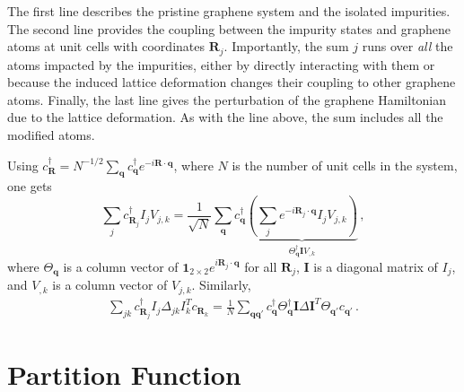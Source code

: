 \documentclass[aps, prb, superscriptaddress, preprint, floatfix]{revtex4-1}
\begin{document}
The first line describes the pristine graphene system and the isolated impurities. The second line provides the coupling between the impurity states and graphene atoms at unit cells with coordinates $\mathbf{R}_j$. Importantly, the sum $j$ runs over \emph{all} the atoms impacted by the impurities, either by directly interacting with them or because the induced lattice deformation changes their coupling to other graphene atoms. Finally, the last line gives the perturbation of the graphene Hamiltonian due to the lattice deformation. As with the line above, the sum includes all the modified atoms.

Using  $c^\dagger_\mathbf{R} = N^{-1/2}\sum_\mathbf{q}c^\dagger_\mathbf{q} e^{-i\mathbf{R}\cdot\mathbf{q}}$, where $N$ is the number of unit cells in the system, one gets
%
\begin{equation}
    \sum_{j}
    c^\dagger_{\mathbf{R}_j} I_j V_{j,k}
    = 
    \frac{1}{\sqrt{N}}
    \sum_\mathbf{q}c^\dagger_{\mathbf{q}}
    \underbrace{\left(\sum_{j}e^{-i\mathbf{R}_j\cdot\mathbf{q}} I_j V_{j,k}\right)}_{\Theta_\mathbf{q}^\dagger \mathbf{I} V_{,k}}\,,
    \label{eqn:Coupling}
\end{equation}
%
where $\Theta_\mathbf{q}$ is a column vector of $\mathbf{1}_{2\times 2} e^{i\mathbf{R}_j\cdot\mathbf{q}}$ for all $\mathbf{R}_j$, $\mathbf{I}$ is a diagonal matrix of $I_j$, and $V_{,k}$ is a column vector of $V_{j,k}$. Similarly,
%
\begin{align}
	\sum_{jk} c_{\mathbf{R}_j}^\dagger I_j \Delta_{jk} I^T_kc_{\mathbf{R}_k}
	=\frac{1}{N}\sum_{\mathbf{qq}'} c_{\mathbf{q}}^\dagger \Theta_{\mathbf{q}}^\dagger\mathbf{I}\Delta \mathbf{I}^T\Theta_{\mathbf{q}'}c_{\mathbf{q}'}\,.
	\label{eqn:Delta}
\end{align}
%

\section{Partition Function}
\end{document}
